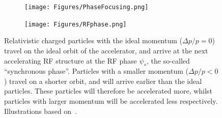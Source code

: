 \begin{figure}
\begin{subfigure}[b]{0.4\textwidth}
\centering
 \texttt{[image: Figures/PhaseFocusing.png]}
\end{subfigure}\hfill
\begin{subfigure}[b]{0.49\textwidth}
\centering
 \texttt{[image: Figures/RFphase.png]}
\end{subfigure}
\caption[Phase focusing]{Relativistic charged particles with the ideal momentum ($\Delta p/p = 0$) travel on the ideal orbit of the accelerator, and arrive at the next accelerating RF structure at the RF phase $\psi_s$, the so-called ``synchronous phase''. 
Particles with a smaller momentum ($\Delta p/p < 0$) travel on a shorter orbit, and will arrive earlier than the ideal particles.
These particles will therefore be accelerated more, whilst particles with larger momentum will be accelerated less respectively.
Illustrations based on~\cite{Anke}.}
\label{fig:RFPhase}
\end{figure}


